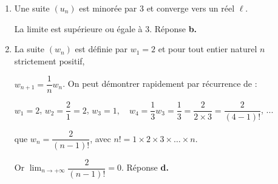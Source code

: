 \begin{enumerate}
Comme $\text{e}^x > 0$ quel que soit le réel $x$ le signe de $h''(x)$ est celui de $x + 3$ qui est positif sur 

$]-3~;~+ \infty[$. Sur cet intervalle la fonction est convexe. Réponse \textbf{d.}

\item Une suite $\left(u_n\right)$ est minorée par 3 et converge vers un réel $\ell$.

La limite est supérieure ou égale à 3. Réponse \textbf{b.}

\item  La suite $\left(w_n\right)$ est définie par $w_1 = 2$ et pour tout entier naturel $n$ strictement positif, 

$w_{n+1} = \dfrac1n w_n$.
On peut démontrer rapidement par récurrence de :

$w_1 = 2$, \quad $w_2 = \dfrac{2}{1} = 2$, \quad $w_3 = 1, \quad w_4 = \dfrac{1}{3}w_3 = \dfrac13 = \dfrac{2}{2 \times 3} = \dfrac{2}{(4 - 1)!}$, ...

que $w_n = \dfrac{2}{(n-1)!}$, avec $n! = 1 \times 2 \times 3 \times \ldots \times n$.

Or $\displaystyle\lim_{n \to + \infty}\dfrac{2}{(n- 1)!} = 0$. Réponse \textbf{d.}
\end{enumerate}

\bigskip

